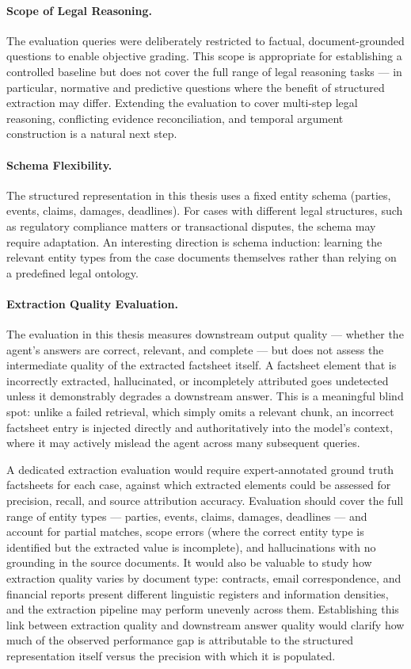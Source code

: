 \paragraph{Scope of Legal Reasoning.}
The evaluation queries were deliberately restricted to factual, document-grounded questions to enable objective grading. This scope is appropriate for establishing a controlled baseline but does not cover the full range of legal reasoning tasks --- in particular, normative and predictive questions where the benefit of structured extraction may differ. Extending the evaluation to cover multi-step legal reasoning, conflicting evidence reconciliation, and temporal argument construction is a natural next step.

\paragraph{Schema Flexibility.}
The structured representation in this thesis uses a fixed entity schema (parties, events, claims, damages, deadlines). For cases with different legal structures, such as regulatory compliance matters or transactional disputes, the schema may require adaptation. An interesting direction is schema induction: learning the relevant entity types from the case documents themselves rather than relying on a predefined legal ontology.

\paragraph{Extraction Quality Evaluation.}
The evaluation in this thesis measures downstream output quality --- whether the agent's answers are correct, relevant, and complete --- but does not assess the intermediate quality of the extracted factsheet itself. A factsheet element that is incorrectly extracted, hallucinated, or incompletely attributed goes undetected unless it demonstrably degrades a downstream answer. This is a meaningful blind spot: unlike a failed retrieval, which simply omits a relevant chunk, an incorrect factsheet entry is injected directly and authoritatively into the model's context, where it may actively mislead the agent across many subsequent queries.

A dedicated extraction evaluation would require expert-annotated ground truth factsheets for each case, against which extracted elements could be assessed for precision, recall, and source attribution accuracy. Evaluation should cover the full range of entity types --- parties, events, claims, damages, deadlines --- and account for partial matches, scope errors (where the correct entity type is identified but the extracted value is incomplete), and hallucinations with no grounding in the source documents. It would also be valuable to study how extraction quality varies by document type: contracts, email correspondence, and financial reports present different linguistic registers and information densities, and the extraction pipeline may perform unevenly across them. Establishing this link between extraction quality and downstream answer quality would clarify how much of the observed performance gap is attributable to the structured representation itself versus the precision with which it is populated.

